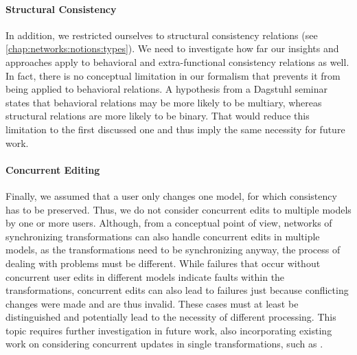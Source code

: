 \paragraph{Structural Consistency}
In addition, we restricted ourselves to structural consistency relations (see \autoref{chap:networks:notions:types}).
We need to investigate how far our insights and approaches apply to behavioral and extra-functional consistency relations as well.
In fact, there is no conceptual limitation in our formalism that prevents it from being applied to behavioral relations.
A hypothesis from a Dagstuhl seminar~\cite{cleve2019dagstuhl} states that behavioral relations may be more likely to be multiary, whereas structural relations are more likely to be binary.
That would reduce this limitation to the first discussed one and thus imply the same necessity for future work.

\paragraph{Concurrent Editing}
Finally, we assumed that a user only changes one model, for which consistency has to be preserved.
Thus, we do not consider concurrent edits to multiple models by one or more users.
Although, from a conceptual point of view, networks of synchronizing transformations can also handle concurrent edits in multiple models, as the transformations need to be synchronizing anyway, the process of dealing with problems must be different.
While failures that occur without concurrent user edits in different models indicate faults within the transformations, concurrent edits can also lead to failures just because conflicting changes were made and are thus invalid.
These cases must at least be distinguished and potentially lead to the necessity of different processing.
This topic requires further investigation in future work, also incorporating existing work on considering concurrent updates in single transformations, such as \cite{xiong2013SynchronizingConcurrentUpdates-SoSym,xiong2009parallelUpdates-ICMT}.


